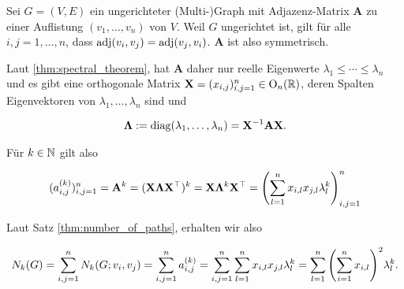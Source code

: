             \begin{remark} \label{rem:number_of_paths_undirected}

                Sei $G = (V, E)$ ein ungerichteter (Multi-)Graph mit Adjazenz-Matrix $\mathbf A$ zu einer Auflistung $(v_1, \dots, v_n)$ von $V$.
                Weil $G$ ungerichtet ist, gilt für alle $i, j = 1, \dots, n$, dass $\operatorname{adj}(v_i, v_j) = \operatorname{adj}(v_j, v_i)$.
                $\mathbf A$ ist also symmetrisch.

                Laut \ref{thm:spectral_theorem}, hat $\mathbf A$ daher nur reelle Eigenwerte $\lambda_1 \leq \cdots \leq \lambda_n$ und es gibt eine orthogonale Matrix $\mathbf X = (x_{i,j})_{i,j=1}^n \in \operatorname O_n(\mathbb R)$, deren Spalten Eigenvektoren von $\lambda_1, \dots, \lambda_n$ sind und

                \begin{align*}
                    \mathbf \Lambda
                    :=
                    \operatorname{diag}(\lambda_1, \dots, \lambda_n)
                    =
                    \mathbf X^{-1} \mathbf A \mathbf X.
                \end{align*}

                Für $k \in \mathbb N$ gilt also

                \begin{align*}
                    (a_{i,j}^{(k)})_{i,j=1}^n
                    =
                    \mathbf A^k
                    =
                    (\mathbf X \mathbf \Lambda \mathbf X^\top)^k
                    =
                    \mathbf X \mathbf \Lambda^k \mathbf X^\top
                    =
                    {\left ( 
                        \sum_{l=1}^n
                            x_{i,l} x_{j,l} \lambda_l^k
                     \right )}_{i,j=1}^n
                \end{align*}

                Laut Satz \ref{thm:number_of_paths}, erhalten wir also

                \begin{align*}
                    N_k(G)
                    =
                    \sum_{i,j=1}^n
                        N_k(G; v_i, v_j)
                    =
                    \sum_{i,j=1}^n
                        a_{i, j}^{(k)}
                    =
                    \sum_{i,j=1}^n
                        \sum_{l=1}^n
                        x_{i,l} x_{j,l} \lambda_l^k
                    =
                    \sum_{l=1}^n
                        {\left ( 
                            \sum_{i=1}^n
                                x_{i,l}
                         \right )}^2
                        \lambda_l^k.
                \end{align*}

            \end{remark}

